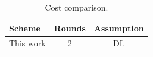 \begin{table}[t]
  \centering
  \begin{tabular}{lcc}
    Scheme & Rounds & Assumption \\ \hline
    This work & 2 & DL \\
  \end{tabular}
  \caption{Cost comparison.}\label{tab:comparison}
\end{table}
